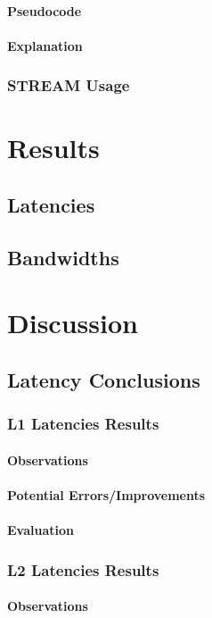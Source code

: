 \documentclass[bsc,frontabs,twoside,singlespacing,parskip,deptreport]{infthesis}     %
\begin{document}
\subsubsection{Pseudocode}
\subsubsection{Explanation}
\subsection{STREAM Usage}

\newpage

\chapter{Results}
\section{Latencies}
\newpage
\section{Bandwidths}
\newpage

\chapter{Discussion}
\section{Latency Conclusions}
\subsection{L1 Latencies Results}
\subsubsection{Observations}
\subsubsection{Potential Errors/Improvements}
\subsubsection{Evaluation}
\subsection{L2 Latencies Results}
\subsubsection{Observations}
\end{document}
